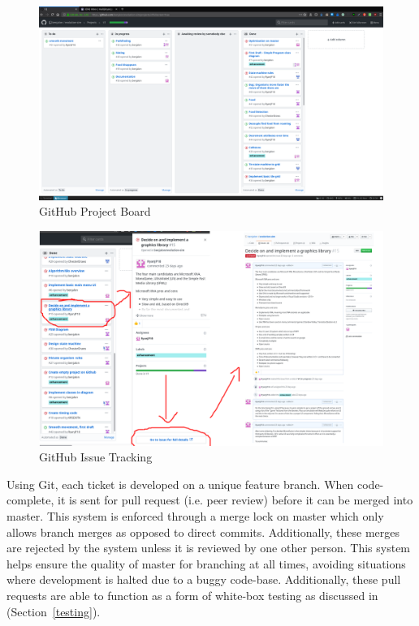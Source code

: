\documentclass[a4paper, oneside, 11pt]{report}
\begin{document}
\begin{figure}[H]
	\caption{GitHub Project Board}\label{gitboard}
	\centering
	\includegraphics[width=1\textwidth]{gitproj}
\end{figure}

\begin{figure}[H]
	\caption{GitHub Issue Tracking}\label{gitissue}
	\centering
	\includegraphics[width=1\textwidth]{gitissuetrack}
\end{figure}

Using Git, each ticket is developed on a unique feature branch. When code-complete, it is sent for pull request (i.e. peer review) before it can be merged into master. This system is enforced through a merge lock on master which only allows branch merges as opposed to direct commits. Additionally, these merges are rejected by the system unless it is reviewed by one other person. This system helps ensure the quality of master for branching at all times, avoiding situations where development is halted due to a buggy code-base. Additionally, these pull requests are able to function as a form of white-box testing as discussed in (Section~\ref{testing}).
\end{document}
